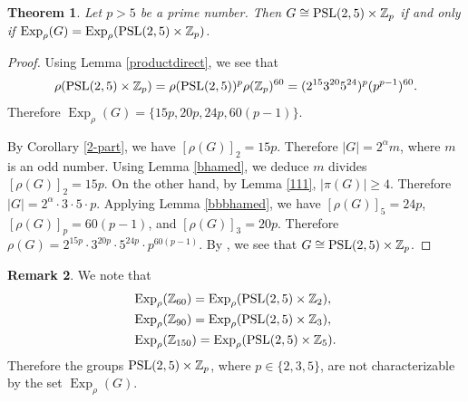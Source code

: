 \documentclass[12pt]{amsart}
\newtheorem{theorem}{Theorem}[section]
\theoremstyle{definition}
\newtheorem{remark}[theorem]{Remark}
\begin{document}
\begin{theorem}
	Let $p > 5$ be a prime number. Then
	$G \cong {\rm PSL}(2, 5) \times \mathbb{Z}_p$   if and only if  ${\operatorname{Exp}}_{\rho}(G) = {\operatorname{Exp}}_{\rho}({\rm PSL}(2, 5) \times \mathbb{Z}_p)$.
\end{theorem}
\begin{proof}
	Using Lemma \ref{productdirect}, we see that
	$$\rho({\rm PSL}(2, 5) \times \mathbb{Z}_p)=\rho({\rm PSL}(2, 5))^p\rho(\mathbb{Z}_p)^{60}=(2^{15}3^{20}5^{24})^p(p^{p-1})^{60}.$$
	Therefore ${\operatorname{Exp}}_{\rho}(G) = \{15p, 20p, 24p, 60(p-1)\}$.
	
	By Corollary \ref{2-part}, we have $[\rho(G)]_2=15p$. Therefore $|G|=2^{\alpha } m$, where $m$ is an odd number.
Using Lemma \ref{bhamed}, we deduce  $m$	divides  $[\rho(G)]_2=15p$.
On the other hand,
	by Lemma  \ref{111}, $|\pi(G)|\geqslant 4$.
	Therefore $|G|=2^\alpha\cdot 3  \cdot 5 \cdot p$.   
	Applying  Lemma \ref{bbbhamed},
	we have $[\rho(G)]_5=24p$, $[\rho(G)]_p=60(p-1)$, and  $[\rho(G)]_3=20p$. Therefore  
	$\rho(G) = 2^{15p}\cdot3^{20p}\cdot5^{24p} \cdot p^{60(p-1)}$.
	By \cite[Theorem 2.3]{banihamedcom}, we see that $G \cong {\rm PSL}(2,5) \times \mathbb{Z}_p$.
\end{proof}	

\begin{remark}
	We note that
	\begin{align*}
&	{\operatorname{Exp}}_{\rho}(\mathbb{Z}_{60}) = {\operatorname{Exp}}_{\rho}({\rm PSL}(2, 5) \times \mathbb{Z}_2),\\
&	{\operatorname{Exp}}_{\rho}(\mathbb{Z}_{90}) = {\operatorname{Exp}}_{\rho}({\rm PSL}(2, 5) \times \mathbb{Z}_3),\\
&{\operatorname{Exp}}_{\rho}(\mathbb{Z}_{150}) = {\operatorname{Exp}}_{\rho}({\rm PSL}(2, 5) \times \mathbb{Z}_5).
		\end{align*}
Therefore the groups ${\rm PSL}(2, 5) \times \mathbb{Z}_p$, where $p \in\{2,3,5\}$, are not characterizable by the set ${\operatorname{Exp}}_{\rho}(G)$.
\end{remark}
\end{document}
